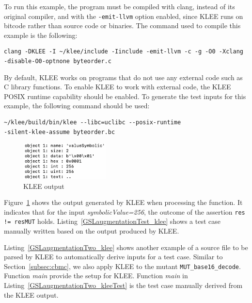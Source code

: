 To run this example, the program must be compiled with clang, instead of its original compiler, and with the \texttt{-emit-llvm} option enabled, since KLEE runs on bitcode rather than source code or binaries. The command used to compile this example is the following:

\begin{verbatim}
clang -DKLEE -I ~/klee/include -Iinclude -emit-llvm -c -g -O0 -Xclang 
-disable-O0-optnone byteorder.c
\end{verbatim}

By default, KLEE works on programs that do not use any external code such as C library functions. To enable KLEE to work with external code, the KLEE POSIX runtime capability should be enabled. To generate the test inputs for this example, the following command should be used:

\begin{verbatim}
~/klee/build/bin/klee --libc=uclibc --posix-runtime 
-silent-klee-assume byteorder.bc
\end{verbatim}

\begin{figure}[h]
\begin{center}
\includegraphics[width=0.4\textwidth]{images/klee_output_1}
\caption{KLEE output}
\label{fig:klee_output_1}
\end{center}
\end{figure}



Figure~\ref{fig:klee_output_1} shows the output generated by KLEE when processing the function. It indicates that for the input \emph{symbolicValue=256}, the outcome of the assertion \texttt{res != resMUT} holds. Listing~\ref{GSLaugmentationTest_klee} shows a test case manually written based on the output produced by KLEE.



Listing~\ref{GSLaugmentationTwo_klee} shows another example of a source file to be parsed by KLEE to automatically derive inputs for a test case. Similar to Section~\ref{subsec:cbmc}, we also apply KLEE to the mutant \texttt{MUT\_base16\_decode}. Function \emph{main} provide the setup for KLEE. Function \emph{main} in Listing~\ref{GSLaugmentationTwo_kleeTest} is the test case manually derived from the KLEE output.

